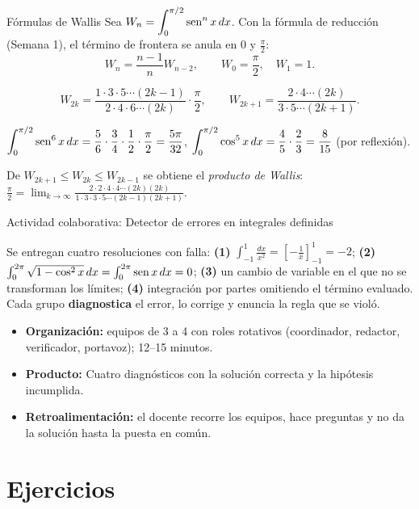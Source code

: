 \documentclass[10pt,aspectratio=169]{beamer}
\begin{document}
\begin{frame}{Fórmulas de Wallis}
  Sea $W_n=\displaystyle\int_0^{\pi/2}\operatorname{sen}^nx\,dx$. Con la fórmula de reducción (Semana 1), el término de
  frontera se anula en $0$ y $\frac\pi2$:
  \[ W_n=\frac{n-1}{n}W_{n-2},\qquad W_0=\frac\pi2,\quad W_1=1. \]
  \begin{teorema}[Wallis]
    \[ W_{2k}=\frac{1\cdot3\cdot5\cdots(2k-1)}{2\cdot4\cdot6\cdots(2k)}\cdot\frac\pi2,\qquad
       W_{2k+1}=\frac{2\cdot4\cdots(2k)}{3\cdot5\cdots(2k+1)}. \]
  \end{teorema}
  \begin{ejemplo}
    $\displaystyle\int_0^{\pi/2}\operatorname{sen}^6x\,dx=\frac{5}{6}\cdot\frac34\cdot\frac12\cdot\frac\pi2=\frac{5\pi}{32}$,
    \qquad $\displaystyle\int_0^{\pi/2}\cos^5x\,dx=\frac45\cdot\frac23=\frac{8}{15}$ (por reflexión).
  \end{ejemplo}
  \small De $W_{2k+1}\le W_{2k}\le W_{2k-1}$ se obtiene el \emph{producto de Wallis}:
    $\displaystyle\frac\pi2=\lim_{k\to\infty}\frac{2\cdot2\cdot4\cdot4\cdots(2k)(2k)}{1\cdot3\cdot3\cdot5\cdots(2k-1)(2k+1)}$.
\end{frame}

\begin{frame}{Actividad colaborativa: Detector de errores en integrales definidas}
  \small
  \begin{activa}
    Se entregan cuatro resoluciones con falla: \textbf{(1)} $\int_{-1}^1\frac{dx}{x^2}=\left[-\frac1x\right]_{-1}^1=-2$; \textbf{(2)} $\int_0^{2\pi}\sqrt{1-\cos^2x}\,dx=\int_0^{2\pi}\operatorname{sen} x\,dx=0$; \textbf{(3)} un cambio de variable en el que no se transforman los límites; \textbf{(4)} integración por partes omitiendo el término evaluado. Cada grupo \textbf{diagnostica} el error, lo corrige y enuncia la regla que se violó.
  \end{activa}
  \begin{itemize}
    \item \textbf{Organización:} equipos de 3 a 4 con roles rotativos (coordinador, redactor, verificador, portavoz); 12--15 minutos.
    \item \textbf{Producto:} Cuatro diagnósticos con la solución correcta y la hipótesis incumplida.
    \item \textbf{Retroalimentación:} el docente recorre los equipos, hace preguntas y no da la solución hasta la puesta en común.
  \end{itemize}
\end{frame}

\section{Ejercicios}
\end{document}
